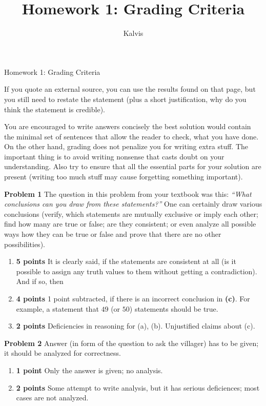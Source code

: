 \documentclass[jou]{apa6}
\title{Homework 1: Grading Criteria}
\author{Kalvis}
\affiliation{RBS}
\begin{document}
\thispagestyle{empty}

\twocolumn
{\Large Homework 1: Grading Criteria}

If you quote an external source, you can use the results found on that page, but 
you still need to restate the statement (plus a short justification, why do you 
think the statement is credible). 

You are encouraged to write answers concisely \textendash{} the best solution would contain the 
minimal set of sentences that allow the reader to check, what you have done. 
On the other hand, grading does not penalize you for writing extra stuff.
The important thing is to avoid writing nonsense that casts doubt on your understanding. 
Also try to ensure that all the essential parts for your solution are present (writing too much 
stuff may cause forgetting something important).




\vspace{2ex}
{\bf Problem 1} The question in this problem from your textbook was this:
{\em ``What conclusions can you draw from these statements?''}
One can certainly draw various 
conclusions (verify, which statements
are mutually exclusive or imply each other; find how many are true 
or false; are they consistent; or even analyze all possible ways how they can 
be true or false and prove that there are no other possibilities).
\begin{enumerate}
\item {\bf 5 points} It is clearly said, if the statements are consistent at all
(is it possible to assign any truth values to them without getting a contradiction). 
And if so, then 
\item {\bf 4 points} 1 point subtracted, if there is an incorrect conclusion in {\bf (c)}.
For example, a statement that $49$ (or $50$) statements should be true.
\item {\bf 2 points} Deficiencies in reasoning for (a), (b). Unjustified claims about (c).
\end{enumerate}


\vspace{2ex}
{\bf Problem 2} Answer (in form of the question to ask the villager) has to be given; 
it should be analyzed for correctness. 
\begin{enumerate}
\item {\bf 1 point} Only the answer is given; no analysis. 
\item {\bf 2 points} Some attempt to write analysis, but it has serious deficiences; 
most cases are not analyzed. 
\end{enumerate}
\end{document}
